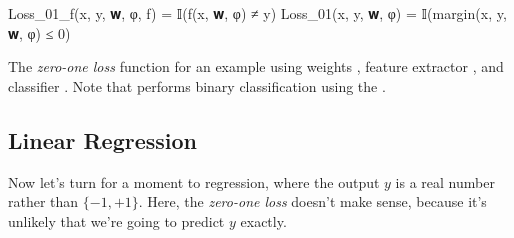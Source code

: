 \begin{algorithm}
\begin{juliaverbatim}
Loss_01_f(x, y, 𝐰, φ, f) = 𝕀(f(x, 𝐰, φ) ≠ y)
Loss_01(x, y, 𝐰, φ) = 𝕀(margin(x, y, 𝐰, φ) ≤ 0)
\end{juliaverbatim}

\caption{
    \label{alg:zero_one_loss}
    The \textit{zero-one loss} function for an example  using weights , feature extractor , and classifier . Note that  performs binary classification using the .
}
\end{algorithm}

\subsection{Linear Regression} %
\label{sub:linear_regression}


Now let's turn for a moment to regression, where the output $y$ is a real number rather than $\{-1,+1\}$.
Here, the \textit{zero-one loss} doesn't make sense, because it's unlikely that we're going to predict $y$ exactly.

